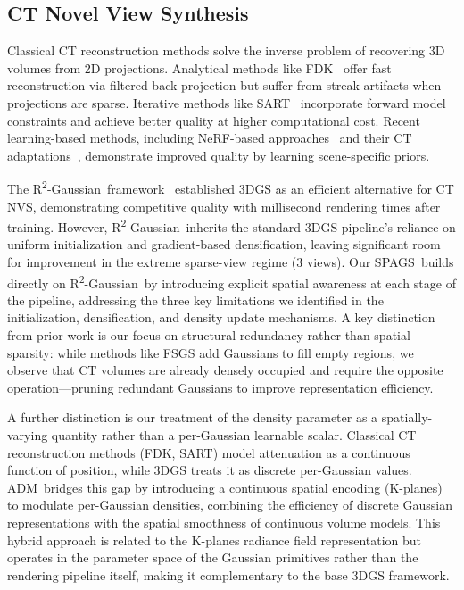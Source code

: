\documentclass{egPublStyle}
\newcommand{\spags}{SPAGS}
\newcommand{\adm}{ADM}
\newcommand{\rtwo}{R\textsuperscript{2}-Gaussian}
\begin{document}
\subsection{CT Novel View Synthesis}
Classical CT reconstruction methods solve the inverse problem of recovering 3D volumes from 2D projections. Analytical methods like FDK~\cite{feldkamp1984practical} offer fast reconstruction via filtered back-projection but suffer from streak artifacts when projections are sparse. Iterative methods like SART~\cite{andersen1984simultaneous} incorporate forward model constraints and achieve better quality at higher computational cost. Recent learning-based methods, including NeRF-based approaches~\cite{mildenhall2021nerf,chen2022pixelnerf} and their CT adaptations~\cite{shen2024nerf,guan2024xray}, demonstrate improved quality by learning scene-specific priors.

The \rtwo\ framework~\cite{hu2024r2} established 3DGS as an efficient alternative for CT NVS, demonstrating competitive quality with millisecond rendering times after training. However, \rtwo\ inherits the standard 3DGS pipeline's reliance on uniform initialization and gradient-based densification, leaving significant room for improvement in the extreme sparse-view regime (3 views). Our \spags\ builds directly on \rtwo\ by introducing explicit spatial awareness at each stage of the pipeline, addressing the three key limitations we identified in the initialization, densification, and density update mechanisms. A key distinction from prior work is our focus on structural redundancy rather than spatial sparsity: while methods like FSGS add Gaussians to fill empty regions, we observe that CT volumes are already densely occupied and require the opposite operation---pruning redundant Gaussians to improve representation efficiency.

A further distinction is our treatment of the density parameter as a spatially-varying quantity rather than a per-Gaussian learnable scalar. Classical CT reconstruction methods (FDK, SART) model attenuation as a continuous function of position, while 3DGS treats it as discrete per-Gaussian values. \adm\ bridges this gap by introducing a continuous spatial encoding (K-planes) to modulate per-Gaussian densities, combining the efficiency of discrete Gaussian representations with the spatial smoothness of continuous volume models. This hybrid approach is related to the K-planes radiance field representation but operates in the parameter space of the Gaussian primitives rather than the rendering pipeline itself, making it complementary to the base 3DGS framework.
\end{document}
